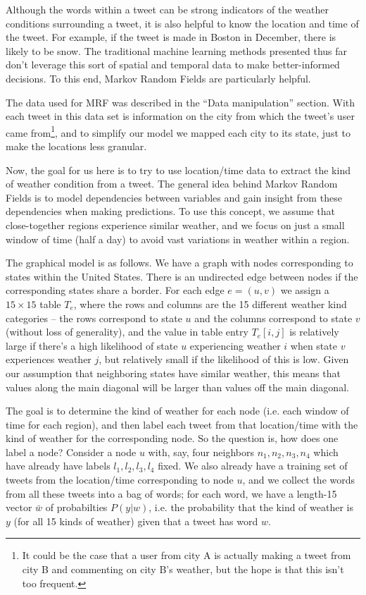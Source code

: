 	Although the words within a tweet can be strong indicators of the weather conditions surrounding a tweet, it is also helpful to know the location and time of the tweet. For example, if the tweet is made in Boston in December, there is likely to be snow. The traditional machine learning methods presented thus far don't leverage this sort of spatial and temporal data to make better-informed decisions. To this end, Markov Random Fields are particularly helpful.

	The data used for MRF was described in the ``Data manipulation'' section. With each tweet in this data set is information on the city from which the tweet's user came from\footnote{It could be the case that a user from city A is actually making a tweet from city B and commenting on city B's weather, but the hope is that this isn't too frequent.}, and to simplify our model we mapped each city to its state, just to make the locations less granular. 

	Now, the goal for us here is to try to use location/time data to extract the kind of weather condition from a tweet. The general idea behind Markov Random Fields is to model dependencies between variables and gain insight from these dependencies when making predictions. To use this concept, we assume that close-together regions experience similar weather, and we focus on just a small window of time (half a day) to avoid vast variations in weather within a region. 

	The graphical model is as follows. We have a graph with nodes corresponding to states within the United States. There is an undirected edge between nodes if the corresponding states share a border. For each edge $e=(u,v)$ we assign a $15 \times 15$ table $T_e$, where the rows and columns are the 15 different weather kind categories -- the rows correspond to state $u$ and the columns correspond to state $v$ (without loss of generality), and the value in table entry $T_e[i,j]$ is relatively large if there's a high likelihood of state $u$ experiencing weather $i$ when state $v$ experiences weather $j$, but relatively small if the likelihood of this is low. Given our assumption that neighboring states have similar weather, this means that values along the main diagonal will be larger than values off the main diagonal.

	The goal is to determine the kind of weather for each node (i.e. each window of time for each region), and then label each tweet from that location/time with the kind of weather for the corresponding node. So the question is, how does one label a node? Consider a node $u$ with, say, four neighbors $n_1, n_2, n_3, n_4$ which have already have labels $l_1, l_2, l_3,l_4$ fixed. We also already have a training set of tweets from the location/time corresponding to node $u$, and we collect the words from all these tweets into a bag of words; for each word, we have a length-15 vector $\bar{w}$ of probabilties $P(y|w)$, i.e. the probability that the kind of weather is $y$ (for all 15 kinds of weather) given that a tweet has word $w$. 

